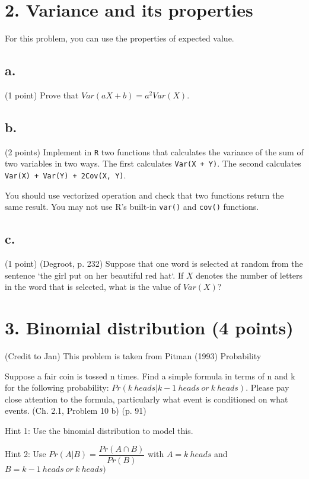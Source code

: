 \documentclass{article}\usepackage[]{graphicx}\usepackage[]{color}
\begin{document}
\section*{2. Variance and its properties}

For this problem, you can use the properties of expected value.

\subsection*{a.} (1 point) Prove that $Var(aX + b) = a^2 Var(X)$.

\subsection*{b.} (2 points) Implement in \verb`R` two functions that calculates the variance of the sum of two variables in two ways. The first calculates \verb`Var(X + Y)`. The second calculates \verb`Var(X) + Var(Y) + 2Cov(X, Y)`.

You should use vectorized operation and check that two functions return the same result. You may not use R's built-in \verb`var()` and \verb`cov()` functions.

\subsection*{c.} (1 point) (Degroot, p. 232) Suppose that one word is selected at random from the sentence `the girl put on her beautiful red hat`. If $X$ denotes the number of letters in the word that is selected, what is the value of $Var(X)$?


\section*{3. Binomial distribution (4 points)}

(Credit to Jan) This problem is taken from Pitman (1993) Probability

Suppose a fair coin is tossed n times. Find a simple formula in terms of n and k for the following probability: $Pr(k\ heads | k-1\ heads\ or\ k\ heads)$. Please pay close attention to the formula, particularly what event is conditioned on what events. (Ch. 2.1, Problem 10 b) (p. 91)

Hint 1: Use the binomial distribution to model this.

Hint 2: Use $Pr(A | B) = \dfrac{Pr (A \cap B)}{Pr (B)}$ with $A = k\ heads$ and $B = k-1\ heads\ or\ k\ heads)$
\end{document}
